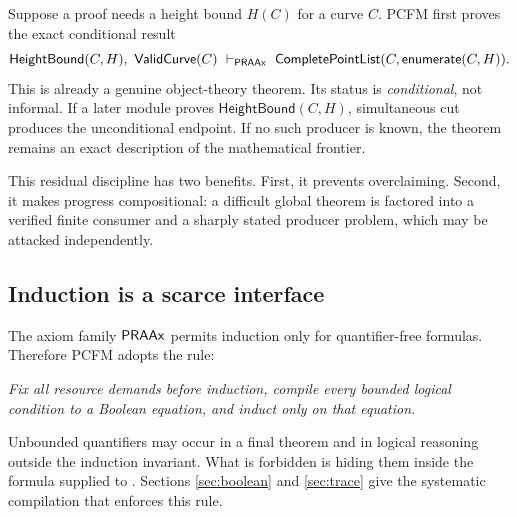 Suppose a proof needs a height bound \(H(C)\) for a curve \(C\).  PCFM first
proves the exact conditional result
\[
  \mathsf{HeightBound}(C,H),\ \mathsf{ValidCurve}(C)
     \ \vdash_{\PRAAx}\
  \mathsf{CompletePointList}(C,\mathsf{enumerate}(C,H)).
\]
This is already a genuine object-theory theorem.  Its status is
\emph{conditional}, not informal.  If a later module proves
\(\mathsf{HeightBound}(C,H)\), simultaneous cut produces the unconditional
endpoint.  If no such producer is known, the theorem remains an exact
description of the mathematical frontier.

This residual discipline has two benefits.  First, it prevents overclaiming.
Second, it makes progress compositional: a difficult global theorem is
factored into a verified finite consumer and a sharply stated producer
problem, which may be attacked independently.

\subsection{Induction is a scarce interface}

The axiom family \(\mathsf{PRAAx}\) permits induction only for quantifier-free formulas.
Therefore PCFM adopts the rule:

\begin{center}
\emph{Fix all resource demands before induction, compile every bounded logical
condition to a Boolean equation, and induct only on that equation.}
\end{center}

Unbounded quantifiers may occur in a final theorem and in logical reasoning
outside the induction invariant.  What is forbidden is hiding them inside the
formula supplied to \code{PRA.qfInd}.  Sections
\ref{sec:boolean} and \ref{sec:trace} give the systematic compilation that
enforces this rule.
